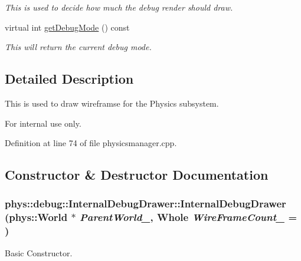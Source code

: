 \begin{DoxyCompactItemize}
\begin{DoxyCompactList}\small\item\em This is used to decide how much the debug render should draw. \item\end{DoxyCompactList}\item 
virtual int \hyperlink{classphys_1_1debug_1_1InternalDebugDrawer_aba329861569d741e970ce5aafb668e84}{getDebugMode} () const 
\begin{DoxyCompactList}\small\item\em This will return the current debug mode. \item\end{DoxyCompactList}\end{DoxyCompactItemize}


\subsection{Detailed Description}
This is used to draw wireframse for the Physics subsystem. \begin{DoxyInternal}{For internal use only.}
\end{DoxyInternal}


Definition at line 74 of file physicsmanager.cpp.



\subsection{Constructor \& Destructor Documentation}
\hypertarget{classphys_1_1debug_1_1InternalDebugDrawer_a0e701e00e1080fdadfcf35e9051789a3}{
\subsubsection[{InternalDebugDrawer}]{\setlength{\rightskip}{0pt plus 5cm}phys::debug::InternalDebugDrawer::InternalDebugDrawer ({\bf phys::World} $\ast$ {\em ParentWorld\_\-}, \/  {\bf Whole} {\em WireFrameCount\_\-} = {})}}
\label{db/d27/classphys_1_1debug_1_1InternalDebugDrawer_a0e701e00e1080fdadfcf35e9051789a3}


Basic Constructor. 

